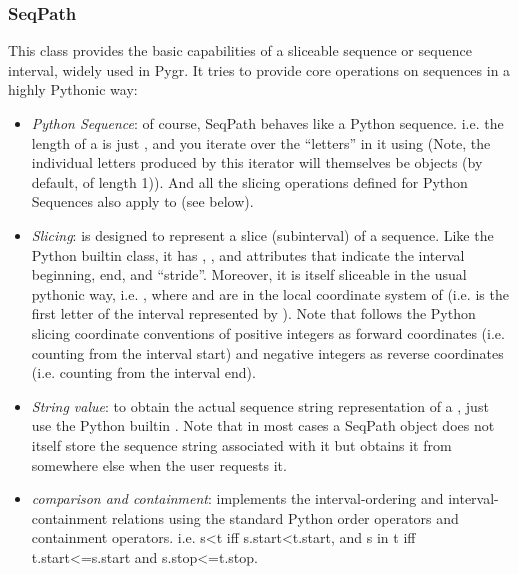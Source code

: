 \documentclass{howto}
\begin{document}
\subsubsection{SeqPath}
This class provides the basic capabilities of a sliceable sequence or sequence interval,
widely used in Pygr.  It tries to provide core operations on sequences in a highly
Pythonic way:

\begin{itemize}

\item    
{\em Python Sequence}: of course, SeqPath behaves like a Python sequence. i.e.
the length of a   is just , 
and you iterate over the ``letters'' in it using   
(Note, the individual letters produced by this iterator
will themselves be  objects (by default, of length 1)).  
And all the slicing
operations defined for Python Sequences also apply to 
 (see below).

\item    
{\em Slicing}:  is designed to represent a slice 
(subinterval) of a sequence.
Like the Python builtin  class, it has , 
, and  attributes that indicate 
the interval beginning, end, and ``stride''.
Moreover, it is itself sliceable in the usual pythonic way, 
i.e. ,
where  and  are in the local coordinate system of  
(i.e.  is the first letter of the interval represented by 
). Note that 
follows the Python slicing coordinate conventions of positive integers as
forward coordinates (i.e. counting from the interval start) and negative integers
as reverse coordinates (i.e. counting from the interval end).

\item    
{\em String value}: to obtain the actual sequence string representation
of a , just use the Python builtin .  
Note that in most cases
a SeqPath object does not itself store the sequence string associated with it
but obtains it from somewhere else when the user requests it.

\item
{\em comparison and containment}: 
implements the interval-ordering
and interval-containment relations using the standard Python order operators
and containment operators. i.e. s<t iff s.start<t.start, and s in t iff
t.start<=s.start and s.stop<=t.stop.


\end{itemize}
\end{document}
